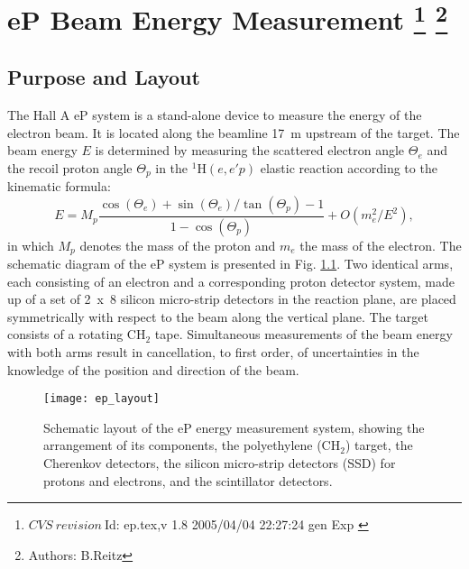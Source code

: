 \chapter[eP Beam Energy Measurement]{eP Beam Energy Measurement
\label{sec:ep}
\footnote{
  $CVS~revision~ $Id: ep.tex,v 1.8 2005/04/04 22:27:24 gen Exp $ $
}
\footnote{Authors: B.Reitz }
}
\section {Purpose and Layout}
\label{sec:ep_purpose}

The Hall A eP system is a stand-alone device to measure the 
energy of the electron beam. It is located along the beamline
17~m upstream of the target. The beam energy $E$ is determined by measuring
the scattered electron angle $\Theta_e$ and the recoil proton angle
$\Theta_p$ in the $^1$H$(e,e'p)$ elastic reaction according to the kinematic
formula:
\begin{equation}
E = M_p \frac{\cos(\Theta_e) + \sin(\Theta_e)/\tan(\Theta_p) - 1}{1 - \cos(\Theta_p)} + O(m_e^2/E^2),
\end{equation}
in which $M_p$ denotes the mass of the proton and $m_e$ the mass of the electron.
The schematic diagram of the eP system is presented in Fig. \ref{fig:ep_layout}. 
Two identical arms, each consisting of an electron and a corresponding proton 
detector system, made up of a set of 2~x~8 silicon micro-strip detectors in the
reaction plane, are placed symmetrically with respect to the beam along the 
vertical plane. The target consists of a rotating CH$_2$ tape.
Simultaneous measurements of the beam energy with both arms result
in cancellation, to first order, of uncertainties in the knowledge of the position
and direction of the beam. 
 \begin{figure}[htb]
    \begin{center}
        \texttt{[image: ep\_layout]}
    \end{center}
    \caption[eP: Layout]{
            Schematic layout of the eP energy measurement system,
            showing the arrangement of its components, the polyethylene (CH$_2$) 
            target, the Cherenkov detectors, the silicon micro-strip detectors (SSD) 
            for protons and electrons, and the scintillator detectors.
            }
    \label{fig:ep_layout} 
 \end{figure}  

